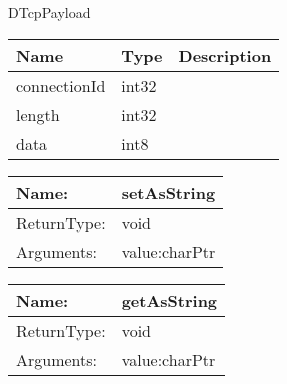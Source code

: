  {DTcpPayload}
\begin{tabular}[ht]{|l|l|p{8cm}|}
\hline
\textbf{Name} & \textbf{Type} & \textbf{Description}\\
\hline
connectionId & int32 & \\
\hline
length & int32 & \\
\hline
data & int8 & \\
\hline
\end{tabular}

\begin{tabular}[ht]{|l|l|}
\hline		
	Name: & setAsString\\
	\hline
	ReturnType: &  void\\
	\hline
	Arguments: & value:charPtr\\
	\hline
\end{tabular}
\newline\newline\newline
\begin{tabular}[ht]{|l|l|}
\hline		
	Name: & getAsString\\
	\hline
	ReturnType: &  void\\
	\hline
	Arguments: & value:charPtr\\
	\hline
\end{tabular}
\newline\newline\newline
